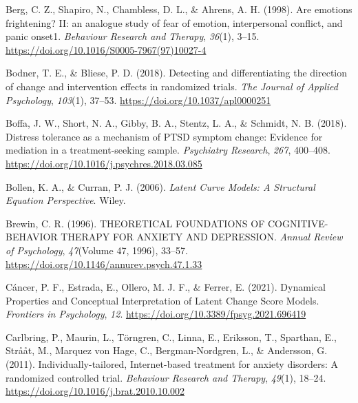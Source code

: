 \documentclass[
  man,floatsintext]{apa7}
\newlength{\cslhangindent}
\newlength{\cslentryspacingunit} %
\newenvironment{CSLReferences}[2] %
 {%
  \setlength{\parindent}{0pt}
  \ifodd #1
  \let\oldpar\par
  \def\par{\hangindent=\cslhangindent\oldpar}
  \fi
  \setlength{\parskip}{#2\cslentryspacingunit}
 }%
 {}
\begin{document}
\begin{CSLReferences}{1}{0}
\leavevmode{}%
Berg, C. Z., Shapiro, N., Chambless, D. L., \& Ahrens, A. H. (1998). Are emotions frightening? II: an analogue study of fear of emotion, interpersonal conflict, and panic onset1. \emph{Behaviour Research and Therapy}, \emph{36}(1), 3--15. \url{https://doi.org/10.1016/S0005-7967(97)10027-4}

\leavevmode{}%
Bodner, T. E., \& Bliese, P. D. (2018). Detecting and differentiating the direction of change and intervention effects in randomized trials. \emph{The Journal of Applied Psychology}, \emph{103}(1), 37--53. \url{https://doi.org/10.1037/apl0000251}

\leavevmode{}%
Boffa, J. W., Short, N. A., Gibby, B. A., Stentz, L. A., \& Schmidt, N. B. (2018). Distress tolerance as a mechanism of PTSD symptom change: Evidence for mediation in a treatment-seeking sample. \emph{Psychiatry Research}, \emph{267}, 400--408. \url{https://doi.org/10.1016/j.psychres.2018.03.085}

\leavevmode{}%
Bollen, K. A., \& Curran, P. J. (2006). \emph{Latent Curve Models: A Structural Equation Perspective}. Wiley.

\leavevmode{}%
Brewin, C. R. (1996). THEORETICAL FOUNDATIONS OF COGNITIVE-BEHAVIOR THERAPY FOR ANXIETY AND DEPRESSION. \emph{Annual Review of Psychology}, \emph{47}(Volume 47, 1996), 33--57. \url{https://doi.org/10.1146/annurev.psych.47.1.33}

\leavevmode{}%
Cáncer, P. F., Estrada, E., Ollero, M. J. F., \& Ferrer, E. (2021). Dynamical Properties and Conceptual Interpretation of Latent Change Score Models. \emph{Frontiers in Psychology}, \emph{12}. \url{https://doi.org/10.3389/fpsyg.2021.696419}

\leavevmode{}%
Carlbring, P., Maurin, L., Törngren, C., Linna, E., Eriksson, T., Sparthan, E., Strååt, M., Marquez von Hage, C., Bergman-Nordgren, L., \& Andersson, G. (2011). Individually-tailored, Internet-based treatment for anxiety disorders: A randomized controlled trial. \emph{Behaviour Research and Therapy}, \emph{49}(1), 18--24. \url{https://doi.org/10.1016/j.brat.2010.10.002}


\end{CSLReferences}
\end{document}
